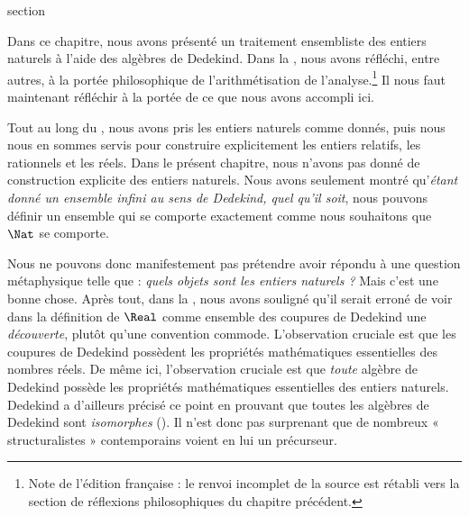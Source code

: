 \documentclass[11pt,a4paper,openany]{memoir}
\begin{document}
\begingroup
\expandafter\def\csname ol@sectioncs\endcsname{section}
\def\olfilename{dedekinds-proof}




Dans ce chapitre, nous avons présenté un traitement ensembliste des
entiers naturels à l'aide des algèbres de Dedekind. Dans la
, nous avons réfléchi, entre autres,
à la portée philosophique de l'arithmétisation de l'analyse.\footnote{Note
de l'édition française : le renvoi incomplet de la source est rétabli
vers la section de réflexions philosophiques du chapitre précédent.}
Il nous faut maintenant réfléchir à la portée de ce que nous avons
accompli ici.

Tout au long du , nous avons pris
les entiers naturels comme donnés, puis nous nous en sommes servis pour
construire explicitement les entiers relatifs, les rationnels et les réels.
Dans le présent chapitre, nous n'avons pas donné de construction explicite
des entiers naturels. Nous avons seulement montré qu'\emph{étant donné
un ensemble infini au sens de Dedekind, quel qu'il soit}, nous pouvons
définir un ensemble qui se comporte exactement comme nous souhaitons
que~$\Nat$ se comporte.

Nous ne pouvons donc manifestement pas prétendre avoir répondu à une
question métaphysique telle que : \emph{quels objets sont les entiers
naturels ?} Mais c'est une bonne chose. Après tout, dans la
, nous avons souligné qu'il serait erroné
de voir dans la définition de $\Real$ comme ensemble des coupures de
Dedekind une \emph{découverte}, plutôt qu'une convention commode.
L'observation cruciale est que les coupures de Dedekind possèdent les
propriétés mathématiques essentielles des nombres réels. De même ici,
l'observation cruciale est que \emph{toute} algèbre de Dedekind possède
les propriétés mathématiques essentielles des entiers naturels.
Dedekind a d'ailleurs précisé ce point en prouvant que toutes les algèbres
de Dedekind sont \emph{isomorphes}
(\citeyear[théorèmes 132--3]{Dedekind1888}). Il n'est donc pas surprenant
que de nombreux « structuralistes » contemporains voient en lui
un précurseur.
\end{document}
